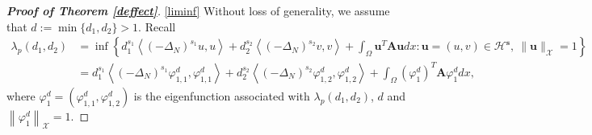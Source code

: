 \documentclass[a4paper,11pt]{amsart}
\theoremstyle{definition}
\def\O{\Omega}
\numberwithin{equation}{section}
\theoremstyle{definition}
\def\O{\Omega}
\begin{document}
\begin{proof} [\bf Proof of Theorem \ref{deffect}]

\ref{liminf} Without loss of generality, we assume that $d:=\min\{d_1,d_2\}>1$. Recall
\begin{align*}
\lambda_p(d_1,d_2)&=\inf\left\{ d^{s_1}_1\left<(-\Delta_N)^{s_1}u,u\right>+d^{s_2}_2\left<(-\Delta_N)^{s_2}v,v\right>+\int_{\O}\textbf{u}^T\textbf{A}\textbf{u}dx:\textbf{u}=(u,v)\in \mathcal{H}^{\textbf{s}},~\|\textbf{u}\|_{\mathcal{X}}=1\right\}\\
&=d^{s_1}_1\left<(-\Delta_N)^{s_1}\varphi_{1,1}^d,\varphi_{1,1}^d\right>+d^{s_2}_2\left<(-\Delta_N)^{s_2}\varphi_{1,2}^d,\varphi_{1,2}^d\right>+\int_{\O}(\varphi_{1}^d)^T\textbf{A}\varphi_{1}^ddx,
\end{align*}
where $\varphi_1^d=\left(\varphi_{1,1}^d,\varphi_{1,2}^d\right)$ is the eigenfunction associated with $\lambda_p(d_1,d_2)$, $d$ and $\left\|\varphi_1^d\right\|_{\mathcal{X}}=1$.


\end{proof}
\end{document}
